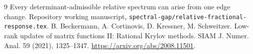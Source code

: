 \documentclass[11pt]{article}
\begin{document}
\begin{thebibliography}{9}
 Every determinant-admissible relative spectrum can arise
from one edge change. Repository working manuscript,
\texttt{spectral-gap/relative-fractional-response.tex}.
 B. Beckermann, A. Cortinovis, D. Kressner, M. Schweitzer.
Low-rank updates of matrix functions II: Rational Krylov methods.
SIAM J. Numer. Anal. 59 (2021), 1325--1347.
\url{https://arxiv.org/abs/2008.11501}.
\end{thebibliography}
\end{document}
